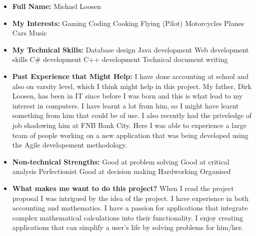 \documentclass{article}
\begin{document}
	\begin{itemize}
		\item \textbf{Full Name:} Michael Loosen
		\item \textbf{My Interests:}
		\subitem Gaming
		\subitem Coding
		\subitem Cooking
		\subitem Flying (Pilot)
		\subitem Motorcycles
		\subitem Planes
		\subitem Cars
		\subitem Music
		
		\item \textbf{My Technical Skills:}
		\subitem Database design
		\subitem Java development
		\subitem Web development skills		
		\subitem C\# development
		\subitem C++ development
		\subitem Technical document writing
		
		\item \textbf{Past Experience that Might Help:} \newline
		I have done accounting at school and also on varsity level, which I think might help in this project. My father, Dirk Loosen, has been in IT since before I was born and this is what lead to my interest in computers. I have learnt a lot from him, so I might have learnt something from him that could be of use. I also recently had the priveledge of job shadowing him at FNB Bank City. Here I was able to experience a large team of people working on a new application that was being developed using the Agile developement methodology.
		
		\item \textbf{Non-technical Strengths:}
		\subitem Good at problem solving
		\subitem Good at critical analysis
		\subitem Perfectionist		
		\subitem Good at decision making
		\subitem Hardworking
		\subitem Organised
		
		\item \textbf{What makes me want to do this project?} \newline
		When I read the project proposal I was intrigued by the idea of the project. I have experience in both accounting and mathematics. I have a passion for applications that integrate complex mathematical calculations into their functionality. I enjoy creating applications that can simplify a user's life by solving problems for him/her.
	\end{itemize}
	
\end{document}
